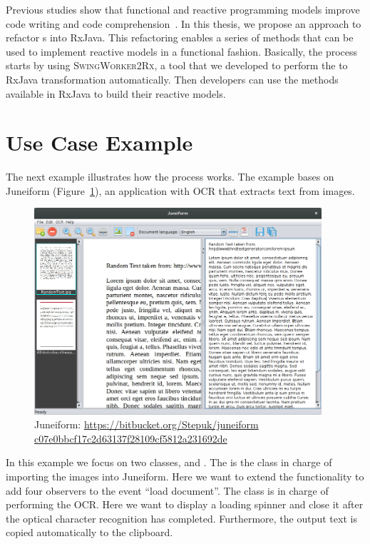 \documentclass[type=bsc,accentcolor=tud9c]{tudthesis}
\newcommand{\framework}[1]{\textcolor{black!65}{#1}}
\newcommand{\toolextension}{\textsc{SwingWorker2Rx}}
\begin{document}
Previous studies show that functional and reactive programming models improve code writing and code comprehension~\cite{promises, paperReactiveComprehension}. In this thesis, we propose an approach to refactor s into \framework{RxJava}. This refactoring enables a series of methods that can be used to implement reactive models in a functional fashion. Basically, the process starts by using \toolextension{}, a tool that we developed to perform the  to \framework{RxJava} transformation automatically. Then developers can use the methods available in \framework{RxJava} to build their reactive models.

\section{Use Case Example}

The next example illustrates how the process works. The example bases on \framework{Juneiform} (Figure~\ref{fig:juneiform}), an application with OCR that extracts text from images.

\begin{figure}[h]
\begin{center}
\includegraphics[width=0.95\textwidth]{juneiform/Juneiform.png}
\caption{Juneiform: \url{https://bitbucket.org/Stepuk/juneiform}\\\href{https://bitbucket.org/Stepuk/juneiform/src/c07e0bbcf17c2d63137f28109cf5812a231692de?at=default}{c07e0bbcf17c2d63137f28109cf5812a231692de}}
\label{fig:juneiform}
\end{center}
\end{figure}

In this example we focus on two classes,  and . The  is the class in charge of importing the images into \framework{Juneiform}. Here we want to extend the functionality to add four observers to the event ``load document''. The  class is in charge of performing the OCR. Here we want to display a loading spinner and close it after the optical character recognition has completed. Furthermore, the output text is copied automatically to the clipboard.
\end{document}
